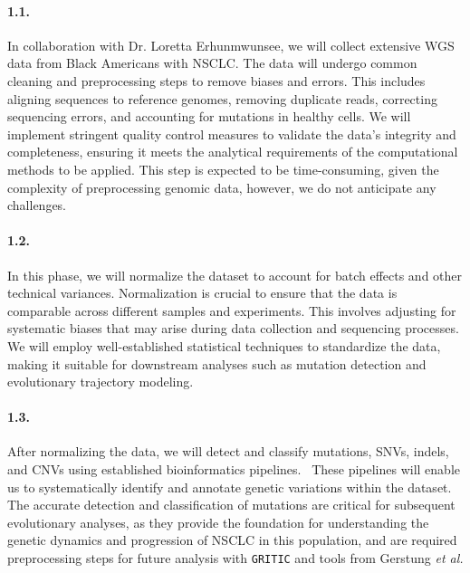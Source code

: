 

\paragraph{1.1. \SpecificAimOneA}

In collaboration with Dr. Loretta Erhunmwunsee, we will collect extensive WGS data from Black Americans with NSCLC.
The data will undergo common cleaning and preprocessing steps to remove biases and errors. 
This includes aligning sequences to reference genomes, removing duplicate reads, correcting sequencing errors, 
and accounting for mutations in healthy cells. 
We will implement stringent quality control measures to validate the data's integrity and completeness, 
ensuring it meets the analytical requirements of the computational methods to be applied. 
This step is expected to be time-consuming, given the complexity of preprocessing genomic data, 
however, we do not anticipate any challenges.

\paragraph{1.2. \SpecificAimOneB}

In this phase, we will normalize the dataset to account for batch effects and other technical variances. 
Normalization is crucial to ensure that the data is comparable across different samples and experiments. 
This involves adjusting for systematic biases that may arise during data collection and sequencing processes. 
We will employ well-established statistical techniques to standardize the data,~\cite{jaffe_practical_2015} 
making it suitable for downstream analyses such as mutation detection and evolutionary trajectory modeling.

\paragraph{1.3. \SpecificAimOneC}

After normalizing the data, we will detect and classify mutations, SNVs, indels, and CNVs using established bioinformatics pipelines.~\cite{koboldt_best_2020-1}
These pipelines will enable us to systematically identify and annotate genetic variations within the dataset. 
The accurate detection and classification of mutations are critical for subsequent evolutionary analyses, 
as they provide the foundation for understanding the genetic dynamics and progression of NSCLC in this population, 
and are required preprocessing steps for future analysis with \texttt{GRITIC} and tools from Gerstung \textit{et al.}

